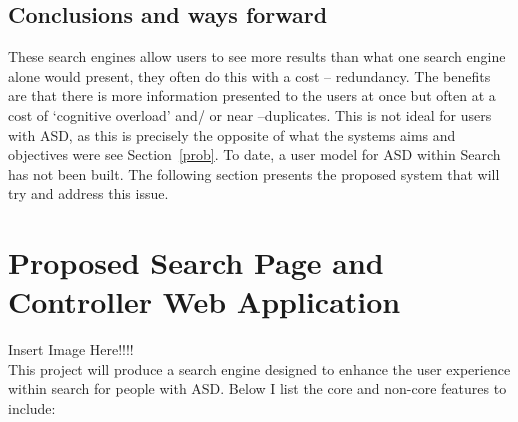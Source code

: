 \documentclass[10pt]{article}
\begin{document}
\subsection{Conclusions and ways forward}
These search engines allow users to see more results than what one search engine alone would present, they often do this with a cost -- redundancy. The benefits are that there is more information presented to the users at once but often at a cost of ‘cognitive overload’ and/ or near –duplicates. This is not ideal for users with ASD, as this is precisely the opposite of what the systems aims and objectives were see Section~\ref{prob}.
To date, a user model for ASD within Search has not been built. The following section presents the proposed system that will try and address this issue.


\section{Proposed Search Page and Controller Web Application}\label{proposed}

Insert Image Here!!!!\\This project will produce a search engine designed to enhance the user experience within search for people with ASD. Below I list the core and non-core features to include:
\end{document}
